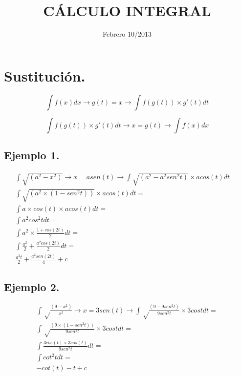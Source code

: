 \documentclass{article}
\title{C\'ALCULO INTEGRAL}
\begin{document}
\date{Febrero 10/2013}
\maketitle

\section{Sustituci\'on.}

\begin{equation}
\int f(x) dx \rightarrow g(t)=x\rightarrow \int f(g(t)) \times g'(t) dt    
\end{equation}

\begin{equation}
\int f(g(t)) \times g'(t) dt \rightarrow x=g(t)\rightarrow \int f(x) dx  
\end{equation}

\subsection{Ejemplo 1.}

\begin{eqnarray}
\int \sqrt {(a^{2}-x^{2})} \rightarrow x=asen(t)\rightarrow \int \sqrt {(a^{2}-a^{2}sen^{2}t)} \times acos(t) dt = \\
\int \sqrt {(a^{2}\times (1-sen^{2}t))} \times acos(t) dt= \\ 
\int a \times cos(t) \times acos(t) dt =\\
\int a^{2}cos^{2}t dt =\\
\int a^{2} \times \frac{1+cos(2t)}{2} dt= \\
\int \frac{a^{2}}{2} + \frac{a^{2}cos(2t)}{2} dt = \\
\frac{a^{2}t}{2} + \frac{a^{2}sen(2t)}{4} +c
\end{eqnarray}

\subsection{Ejemplo 2.}

\begin{eqnarray}
\int \sqrt \frac{(9-x^{2})}{x^{2}} \rightarrow x=3sen(t)\rightarrow \int \sqrt \frac {(9-9sen^{2}t)}{9sen^{2}t} \times 3cost dt = \\
\int \sqrt \frac{(9\times (1-sen^{2}t))}{9sen^{2}t} \times 3cost dt= \\ 
\int \frac{3cos(t) \times 3cos(t)}{9sen^{2}t} dt =\\
\int cot^{2}t dt =\\
-cot(t)-t+c 
\end{eqnarray}
\end{document}
